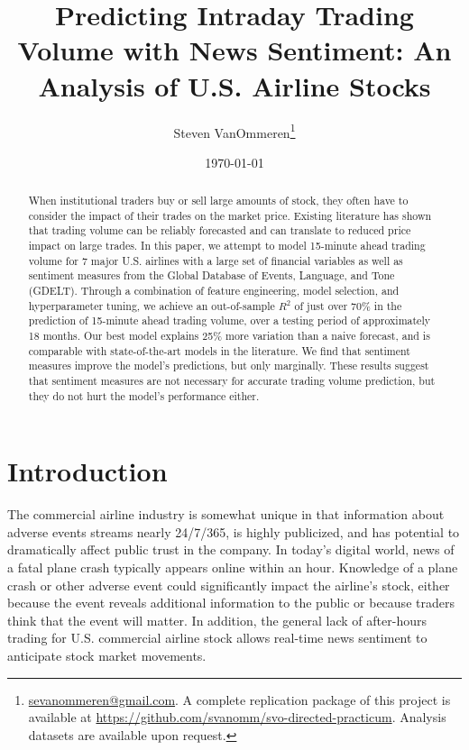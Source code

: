 \documentclass[12pt]{article}
\begin{document}
\title{Predicting Intraday Trading Volume with News Sentiment: An Analysis of U.S. Airline Stocks}
\author{Steven VanOmmeren\thanks{\href{mailto:sevanommeren@gmail.com}{sevanommeren@gmail.com}. A complete replication package of this project is available at \url{https://github.com/svanomm/svo-directed-practicum}. Analysis datasets are available upon request.}}
\date{\today}
\maketitle
\begin{abstract}
\noindent
    When institutional traders buy or sell large amounts of stock, they often have to consider the impact of their trades on the market price. Existing literature has shown that trading volume can be reliably forecasted and can translate to reduced price impact on large trades. In this paper, we attempt to model 15-minute ahead trading volume for 7 major U.S. airlines with a large set of financial variables as well as sentiment measures from the Global Database of Events, Language, and Tone (GDELT). Through a combination of feature engineering, model selection, and hyperparameter tuning, we achieve an out-of-sample $R^2$ of just over 70\% in the prediction of 15-minute ahead trading volume, over a testing period of approximately 18 months. Our best model explains 25\% more variation than a naive forecast, and is comparable with state-of-the-art models in the literature. We find that sentiment measures improve the model's predictions, but only marginally. These results suggest that sentiment measures are not necessary for accurate trading volume prediction, but they do not hurt the model's performance either. 
\end{abstract}
\newpage
\tableofcontents
\newpage

\doublespacing
\section{Introduction}
The commercial airline industry is somewhat unique in that information about adverse events streams nearly 24/7/365, is highly publicized, and has potential to dramatically affect public trust in the company. In today's digital world, news of a fatal plane crash typically appears online within an hour. Knowledge of a plane crash or other adverse event could significantly impact the airline's stock, either because the event reveals additional information to the public or because traders think that the event will matter. In addition, the general lack of after-hours trading for U.S. commercial airline stock allows real-time news sentiment to anticipate stock market movements.
\end{document}
